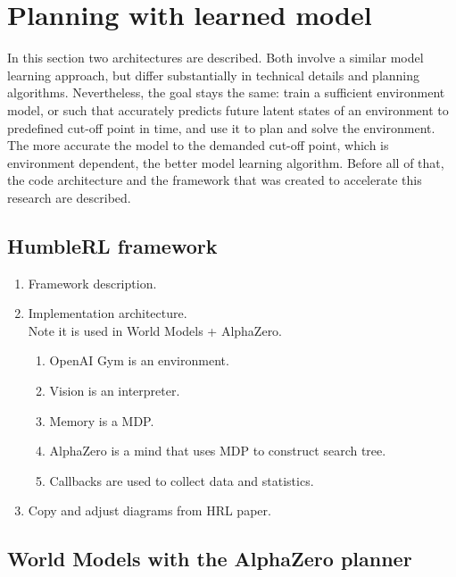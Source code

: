 \section{Planning with learned model}

In this section two architectures are described. Both involve a similar model learning approach, but differ substantially in technical details and planning algorithms. Nevertheless, the goal stays the same: train a sufficient environment model, or such that accurately predicts future latent states of an environment to predefined cut-off point in time, and use it to plan and solve the environment. The more accurate the model to the demanded cut-off point, which is environment dependent, the better model learning algorithm.
Before all of that, the code architecture and the framework that was created to accelerate this research are described.


\subsection{HumbleRL framework}

\begin{enumerate}
\item Framework description.
\item Implementation architecture.\\ Note it is used in World Models + AlphaZero.
  \begin{enumerate}
  \item OpenAI Gym is an environment.
  \item Vision is an interpreter.
  \item Memory is a MDP.
  \item AlphaZero is a mind that uses MDP to construct search tree.
  \item Callbacks are used to collect data and statistics.
  \end{enumerate}
\item Copy and adjust diagrams from HRL paper.
\end{enumerate}

\subsection{World Models with the AlphaZero planner}

